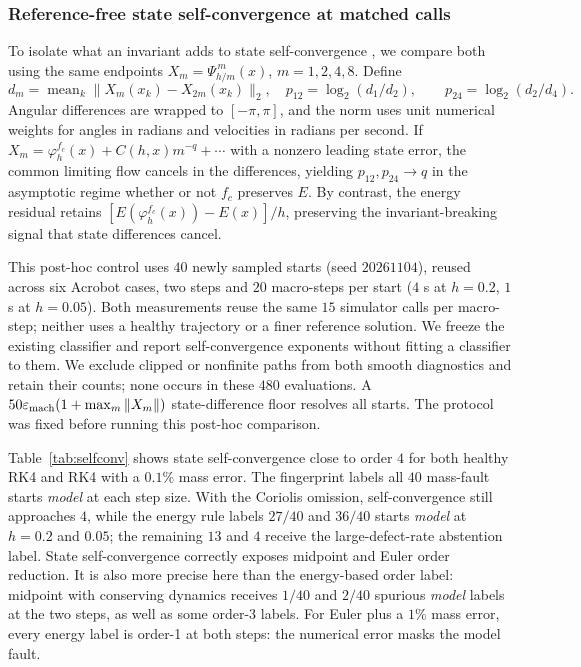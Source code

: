 \documentclass[10pt]{article}
\theoremstyle{definition}
\newcommand{\fittable}[2][\linewidth]{%
  \sbox{\tablebox}{#2}%
  \ifdim\wd\tablebox>#1\relax
    \resizebox{#1}{!}{\usebox{\tablebox}}%
  \else
    \usebox{\tablebox}%
  \fi}
\begin{document}
\subsubsection{Reference-free state self-convergence at matched calls}\label{sec:selfconv}

To isolate what an invariant adds to state self-convergence
\citep{roache1998,nparcconvergence}, we compare both using the same endpoints
$X_m=\Psi_{h/m}^{\,m}(x)$, $m=1,2,4,8$. Define \[
d_m=\operatorname{mean}_k\|X_m(x_k)-X_{2m}(x_k)\|_2,\quad
p_{12}=\log_2(d_1/d_2),\qquad p_{24}=\log_2(d_2/d_4). \] Angular differences
are wrapped to $[-\pi,\pi]$, and the norm uses unit numerical weights for
angles in radians and velocities in radians per second. If
$X_m=\varphi_h^{f_c}(x)+C(h,x)m^{-q}+\cdots$ with a nonzero leading state
error, the common limiting flow cancels in the differences, yielding
$p_{12},p_{24}\to q$ in the asymptotic regime whether or not $f_c$ preserves
$E$. By contrast, the energy residual retains
$[E(\varphi_h^{f_c}(x))-E(x)]/h$, preserving the invariant-breaking signal
that state differences cancel.

This post-hoc control uses $40$ newly sampled starts (seed $20261104$), reused
across six Acrobot cases, two steps and $20$ macro-steps per start ($4$ s at $h=0.2$, $1$ s at
$h=0.05$). Both
measurements reuse the same $15$ simulator calls per macro-step; neither uses
a healthy trajectory or a finer reference solution. We freeze the existing
classifier and report self-convergence exponents without fitting a classifier
to them. We exclude clipped or nonfinite paths from both smooth diagnostics
and retain their counts; none occurs in these $480$ evaluations. A
$50\varepsilon_{\rm mach}(1+\max_m\|X_m\|)$ state-difference floor resolves
all starts. The protocol was fixed before running this post-hoc comparison.

\begin{table}[htbp]
\centering\small
\fittable{}
\caption{Identical-call reference-free measurements on Acrobot. State entries
are median finest self-convergence exponents and between-start percentiles,
not confidence intervals. Energy entries use the frozen guarded classifier.
The $40$ starts are reused across rows.}
\label{tab:selfconv}
\end{table}

Table~\ref{tab:selfconv} shows state self-convergence close to order $4$ for
both healthy RK4 and RK4 with a $0.1\%$ mass error. The fingerprint labels
all $40$ mass-fault starts \emph{model} at each step size. With the Coriolis
omission, self-convergence still approaches $4$, while the energy rule labels
$27/40$ and $36/40$ starts \emph{model} at $h=0.2$ and $0.05$; the remaining
$13$ and $4$ receive the large-defect-rate abstention label. State
self-convergence correctly exposes midpoint and Euler order reduction. It is
also more precise here than the energy-based order label: midpoint with conserving dynamics
receives $1/40$ and $2/40$ spurious \emph{model} labels at the two steps, as
well as some order-3 labels.
For Euler plus a $1\%$ mass error, every energy label is order-1 at both
steps: the numerical error masks the model fault.
\end{document}
